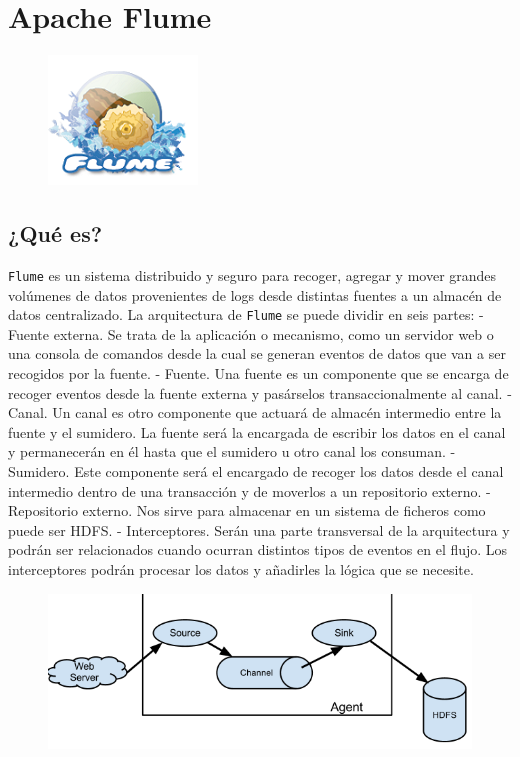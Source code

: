 \documentclass[]{article}
\begin{document}
\section{Apache Flume}\label{apache-flume}

\begin{figure}[H]
\centering
\includegraphics[width=0.4 \textwidth]{img/flume1.png}
\end{figure}

\subsection{¿Qué es?}\label{que-es}

\texttt{Flume} es un sistema distribuido y seguro para recoger, agregar
y mover grandes volúmenes de datos provenientes de logs desde distintas
fuentes a un almacén de datos centralizado. La arquitectura de
\texttt{Flume} se puede dividir en seis partes: - Fuente externa. Se
trata de la aplicación o mecanismo, como un servidor web o una consola
de comandos desde la cual se generan eventos de datos que van a ser
recogidos por la fuente. - Fuente. Una fuente es un componente que se
encarga de recoger eventos desde la fuente externa y pasárselos
transaccionalmente al canal. - Canal. Un canal es otro componente que
actuará de almacén intermedio entre la fuente y el sumidero. La fuente
será la encargada de escribir los datos en el canal y permanecerán en él
hasta que el sumidero u otro canal los consuman. - Sumidero. Este
componente será el encargado de recoger los datos desde el canal
intermedio dentro de una transacción y de moverlos a un repositorio
externo. - Repositorio externo. Nos sirve para almacenar en un sistema
de ficheros como puede ser HDFS. - Interceptores. Serán una parte
transversal de la arquitectura y podrán ser relacionados cuando ocurran
distintos tipos de eventos en el flujo. Los interceptores podrán
procesar los datos y añadirles la lógica que se necesite.

\begin{figure}[H]
\centering
\includegraphics[width=0.8 \textwidth]{img/flume2.png}
\end{figure}
\end{document}
